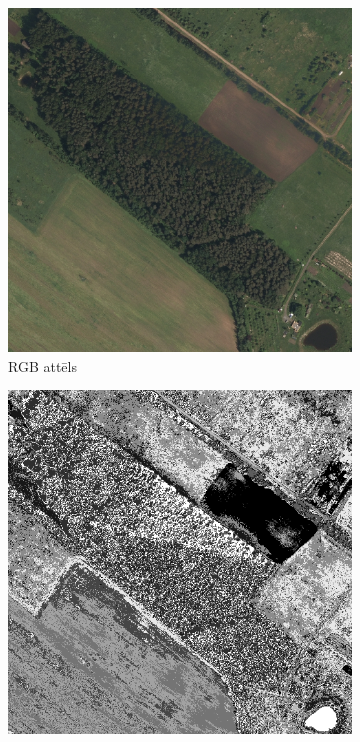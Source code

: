 \documentclass[12pt,paper=a4]{report}
\begin{document}
\begin{figure}[h!]
\centering
\begin{subfigure}[b]{.3\linewidth}
\includegraphics[width=\linewidth]{testImagepart}
\caption{RGB attēls}
\end{subfigure}
\begin{subfigure}[b]{.3\linewidth}
\includegraphics[width=\linewidth]{map10part}

\end{subfigure}
\end{figure}
\end{document}
